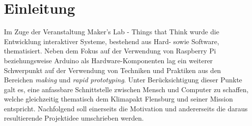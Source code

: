 \documentclass[.../Dokumentation.tex]{subfiles}
\begin{document}
\section{Einleitung}\label{sec-intr}
Im Zuge der Veranstaltung \grqq Maker's Lab - Things that Think\grqq{} wurde die 
Entwicklung interaktiver Systeme, bestehend aus Hard- sowie Software, 
thematisiert.
Neben dem Fokus auf der Verwendung von Raspberry Pi beziehungsweise Arduino als 
Hardware-Komponenten lag ein weiterer Schwerpunkt auf der 
Verwendung von Techniken und Praktiken aus den Bereichen \textit{making} und 
\textit{rapid prototyping}.
Unter Berücksichtigung dieser Punkte galt es, eine \grqq anfassbare\grqq{} Schnittstelle 
zwischen Mensch und Computer zu schaffen, welche gleichzeitig thematisch dem 
Klimapakt Flensburg und seiner Mission entspricht.
Nachfolgend soll einerseits die Motivation und andererseits die daraus 
resultierende Projektidee umschrieben werden.
\end{document}
